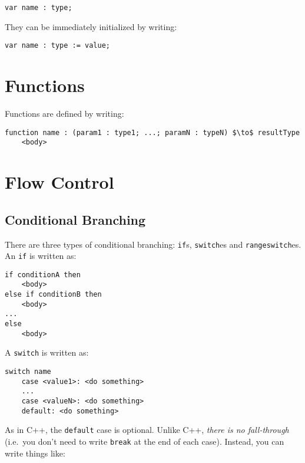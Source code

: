 \begin{lstlisting}[style=Snippet]
var name : type;
\end{lstlisting}
%
They can be immediately initialized by writing:

\begin{lstlisting}[style=Snippet]
var name : type := value;
\end{lstlisting}

\section{Functions}

Functions are defined by writing:

\begin{lstlisting}[style=Snippet]
function name : (param1 : type1; ...; paramN : typeN) $\to$ resultType
	<body>
\end{lstlisting}

\section{Flow Control}

\subsection{Conditional Branching}

There are three types of conditional branching: \lstinline[language=Pseudocode]$if$s, \lstinline[language=Pseudocode]$switch$es and \lstinline[language=Pseudocode]$rangeswitch$es. An \lstinline[language=Pseudocode]$if$ is written as:

\begin{lstlisting}[style=Snippet]
if conditionA then
	<body>
else if conditionB then
	<body>
...
else
	<body>
\end{lstlisting}
%
A \lstinline[language=Pseudocode]$switch$ is written as:

\begin{lstlisting}[style=Snippet]
switch name
	case <value1>: <do something>
	...
	case <valueN>: <do something>
	default: <do something>
\end{lstlisting}
%
As in C++, the \lstinline[language=Pseudocode]$default$ case is optional. Unlike C++, \emph{there is no fall-through} (i.e.~you don't need to write \lstinline[language=Pseudocode]$break$ at the end of each case). Instead, you can write things like:

